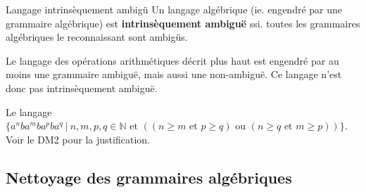 \begin{definition}{Langage intrinsèquement ambigü}{}
Un langage algébrique (ie. engendré par une grammaire algébrique) est \textbf{intrinsèquement ambiguë} ssi. toutes les grammaires algébriques le reconnaissant sont ambigüs.
\end{definition}

\begin{example}
Le langage des opérations arithmétiques décrit plus haut est engendré par au moins une grammaire ambiguë, mais aussi une non-ambiguë. Ce langage n'est donc pas intrinsèquement ambiguë. 
\end{example}

\begin{example}
Le langage $\{a^nba^mba^pba^q ~|~ n,m,p,q \in \mathbb{N} \text{ et } ((n \geq m \text{ et } p \geq q) \text{ ou } (n \geq q \text{ et } m \geq p))\}$. Voir le DM2 pour la justification.
\end{example}

\subsection{Nettoyage des grammaires algébriques}